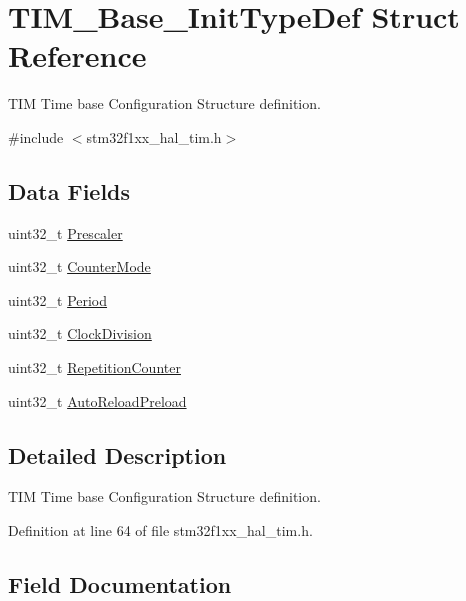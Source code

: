 \hypertarget{struct_t_i_m___base___init_type_def}{}\section{T\+I\+M\+\_\+\+Base\+\_\+\+Init\+Type\+Def Struct Reference}
\label{struct_t_i_m___base___init_type_def}


T\+IM Time base Configuration Structure definition.  




{\ttfamily \#include $<$stm32f1xx\+\_\+hal\+\_\+tim.\+h$>$}

\subsection*{Data Fields}
\begin{DoxyCompactItemize}
\item 
uint32\+\_\+t \hyperlink{struct_t_i_m___base___init_type_def_affb82025da5b8d4a06e61f1690460f4d}{Prescaler}
\item 
uint32\+\_\+t \hyperlink{struct_t_i_m___base___init_type_def_a4b29303489c983d0e9326d7ae0196ceb}{Counter\+Mode}
\item 
uint32\+\_\+t \hyperlink{struct_t_i_m___base___init_type_def_a49500eef6a2354eeee4adc005bf9cef6}{Period}
\item 
uint32\+\_\+t \hyperlink{struct_t_i_m___base___init_type_def_a8f20e02ae2774e1523942604315b8e13}{Clock\+Division}
\item 
uint32\+\_\+t \hyperlink{struct_t_i_m___base___init_type_def_a3c2ea8434bbce30aa191a816e27f9c1f}{Repetition\+Counter}
\item 
uint32\+\_\+t \hyperlink{struct_t_i_m___base___init_type_def_a24796ba26d572a0993cb065a02865723}{Auto\+Reload\+Preload}
\end{DoxyCompactItemize}


\subsection{Detailed Description}
T\+IM Time base Configuration Structure definition. 

Definition at line 64 of file stm32f1xx\+\_\+hal\+\_\+tim.\+h.



\subsection{Field Documentation}
\mbox{\label{struct_t_i_m___base___init_type_def_a24796ba26d572a0993cb065a02865723}} 
